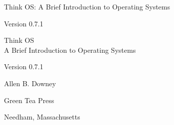 \documentclass[12pt]{book}
\newcommand{\theversion}{0.7.1}
\begin{document}
\begin{latexonly}

\renewcommand{\blankpage}{\thispagestyle{empty} \quad \newpage}



\thispagestyle{empty}

\begin{flushright}
\vspace*{2.0in}

\begin{spacing}{3}
{\huge Think OS: A Brief Introduction to Operating Systems}\\
{\Large }
\end{spacing}

\vspace{0.25in}

Version \theversion

\vfill

\end{flushright}


\blankpage
\blankpage

\pagebreak
\thispagestyle{empty}

\begin{flushright}
\vspace*{2.0in}

\begin{spacing}{3}
{\huge Think OS}\\
{\Large  A Brief Introduction to Operating Systems}
\end{spacing}

\vspace{0.25in}

Version \theversion

\vspace{1in}


{\Large
Allen B. Downey\\
}


\vspace{0.5in}

{\Large Green Tea Press}

{\small Needham, Massachusetts}


\end{flushright}
\end{latexonly}
\end{document}
